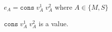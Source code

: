 \begin{case}
$e_{A}=\mathtt{cons}\;v_{A}^{1}\;v_{A}^{2}$ where $A\in\lbrace M,S\rbrace$

$\mathtt{cons}\;v_{A}^{1}\;v_{A}^{2}$ is a value.
\end{case}